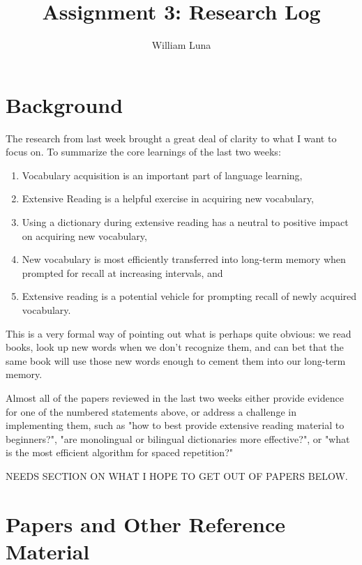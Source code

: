 \documentclass[
	letterpaper, %
]{jdf}
\author{William Luna}
\title{Assignment 3: Research Log}
\begin{document}

\maketitle

\section{Background}
The research from last week brought a great deal of clarity to what I want to focus on. To summarize the core learnings of the last two weeks:
\begin{enumerate}
    \item Vocabulary acquisition is an important part of language learning,
    \item Extensive Reading is a helpful exercise in acquiring new vocabulary,
    \item Using a dictionary during extensive reading has a neutral to positive impact on acquiring new vocabulary,
    \item New vocabulary is most efficiently transferred into long-term memory when prompted for recall at increasing intervals, and
    \item Extensive reading is a potential vehicle for prompting recall of newly acquired vocabulary.
\end{enumerate}

This is a very formal way of pointing out what is perhaps quite obvious: we read books, look up new words when we don't recognize them, and can bet that the same book will use those new words enough to cement them into our long-term memory.    

Almost all of the papers reviewed in the last two weeks either provide evidence for one of the numbered statements above, or address a challenge in implementing them, such as "how to best provide extensive reading material to beginners?", "are monolingual or bilingual dictionaries more effective?", or "what is the most efficient algorithm for spaced repetition?" 

NEEDS SECTION ON WHAT I HOPE TO GET OUT OF PAPERS BELOW.

\section{Papers and Other Reference Material}
\end{document}
